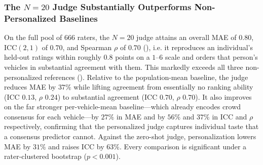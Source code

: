 \subsubsection{The $N{=}20$ Judge Substantially Outperforms Non-Personalized Baselines}
\label{sec:res-ctx20}
On the full pool of $666$ raters, the $N{=}20$ judge attains an overall MAE of
$0.80$, ICC$(2,1)$ of $0.70$, and Spearman $\rho$ of $0.70$
(), i.e. it reproduces an individual's held-out ratings
within roughly $0.8$ points on a $1$--$6$ scale and orders that person's vehicles
in substantial agreement with them. This markedly exceeds all three non-personalized
references (). Relative to the population-mean baseline,
the judge reduces MAE by $37\%$ while lifting agreement from essentially no ranking
ability (ICC $0.13$, $\rho$ $0.24$) to substantial agreement (ICC $0.70$, $\rho$
$0.70$). It also improves on the far stronger per-vehicle-mean baseline---which
already encodes crowd consensus for each vehicle---by $27\%$ in MAE and by $56\%$
and $37\%$ in ICC and $\rho$ respectively, confirming that the personalized judge
captures individual taste that a consensus predictor cannot. Against the zero-shot
judge, personalization lowers MAE by $31\%$ and raises ICC by $63\%$. Every
comparison is significant under a rater-clustered bootstrap ($p < 0.001$).

